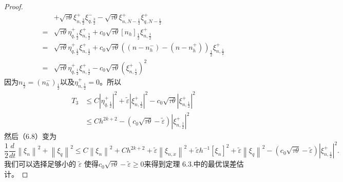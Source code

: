 \begin{proof}
$$\begin{aligned}
                   & +\sqrt{\tau \theta} \xi_{n, \frac{3}{2}}^{+} \xi_{q, \frac{3}{2}}^{-}-\sqrt{\tau \theta} \xi_{n, N-\frac{1}{2}}^{+} \xi_{q, N-\frac{1}{2}}^{+}                                                                                                                                                     \\
            =      & \sqrt{\tau \theta} \eta_{q, \frac{1}{2}}^{+} \xi_{n, \frac{1}{2}}^{+}+c_{0} \sqrt{\tau \theta}\left[n_{h}\right]_{\frac{1}{2}} \xi_{n, \frac{1}{2}}^{+}                                                                                                                                            \\
            =      & \sqrt{\tau \theta} \eta_{q, \frac{1}{2}}^{+} \xi_{n, \frac{1}{2}}^{+}+c_{0} \sqrt{\tau \theta}\left(\left(n-n_{h}^{-}\right)-\left(n-n_{h}^{+}\right)\right)_{\frac{1}{2}} \xi_{n, \frac{1}{2}}^{+}                                                                                                \\
            =      & \sqrt{\tau \theta} \eta_{q, \frac{1}{2}}^{+} \xi_{n, \frac{1}{2}}^{+}-c_{0} \sqrt{\tau \theta}\left(\xi_{n, \frac{1}{2}}^{+}\right)^{2}
        \end{aligned}
    $$
    因为$n_{\frac{1}{2}}=\left(n_{h}^{-}\right)_{\frac{1}{2}}$以及$\eta_{n, \frac{1}{2}}^{+}=0$。所以
    $$
        \begin{aligned}
            T_{3} & \leq C\left|\eta_{q, \frac{1}{2}}^{+}\right|^{2}+\tilde{\varepsilon}\left|\xi_{n, \frac{1}{2}}^{+}\right|^{2}-c_{0} \sqrt{\tau \theta}\left|\xi_{n, \frac{1}{2}}^{+}\right|^{2} \\
                  & \leq C h^{2 k+2}-\left(c_{0} \sqrt{\tau \theta}-\tilde{\varepsilon}\right)\left|\xi_{n, \frac{1}{2}}^{+}\right|^{2}
        \end{aligned}
    $$
    然后（6.8）变为
    \begin{equation}
        \frac{1}{2} \frac{d}{d t}\left\|\xi_{n}\right\|^{2}+\left\|\xi_{q}\right\|^{2} \leq C\left\|\xi_{n}\right\|^{2}+C h^{2 k+2}+\tilde{\varepsilon}\left\|\xi_{n, x}\right\|^{2}+\tilde{\varepsilon} h^{-1}\left[\xi_{n}\right]^{2}+\tilde{\varepsilon}\left\|\xi_{q}\right\|^{2}-\left(c_{0} \sqrt{\tau \theta}-\tilde{\varepsilon}\right)\left|\xi_{n, \frac{1}{2}}^{+}\right|^{2}.
    \end{equation}
    我们可以选择足够小的 $\tilde{\varepsilon}$ 使得$c_{0} \sqrt{\tau \theta}-\tilde{\varepsilon} \geq 0$来得到定理 6.3.中的最优误差估计。
\end{proof}
